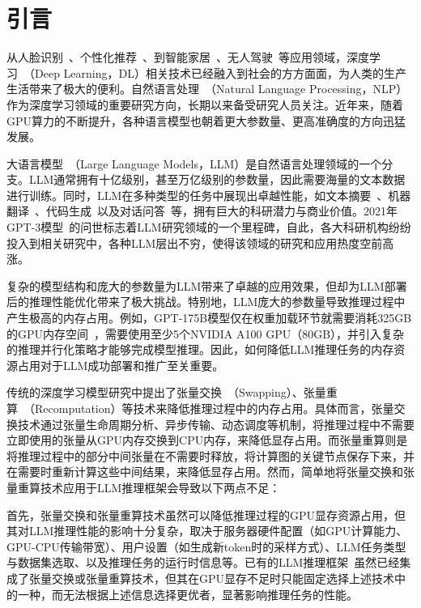 \section{引言}

从人脸识别~\cite{Face-Recognition}、个性化推荐~\cite{Personal-Recommendation}、到智能家居~\cite{Smart-Home}、无人驾驶~\cite{Self-Driving-Car}等应用领域，深度学习~\cite{Deep-Learning}（Deep Learning，DL）相关技术已经融入到社会的方方面面，为人类的生产生活带来了极大的便利。自然语言处理~\cite{NLP}（Natural Language Processing，NLP）作为深度学习领域的重要研究方向，长期以来备受研究人员关注。近年来，随着GPU算力的不断提升，各种语言模型也朝着更大参数量、更高准确度的方向迅猛发展。

大语言模型~\cite{LLM}（Large Language Models，LLM）是自然语言处理领域的一个分支。LLM通常拥有十亿级别，甚至万亿级别的参数量，因此需要海量的文本数据进行训练。同时，LLM在多种类型的任务中展现出卓越性能，如文本摘要~\cite{Text-Summarization}、机器翻译~\cite{Machine-Translation}、代码生成~\cite{Code-Generation}以及对话问答~\cite{Question-Answer}等，拥有巨大的科研潜力与商业价值。2021年GPT-3模型~\cite{Text-Summarization, GPT3}的问世标志着LLM研究领域的一个里程碑，自此，各大科研机构纷纷投入到相关研究中，各种LLM层出不穷，使得该领域的研究和应用热度空前高涨。

复杂的模型结构和庞大的参数量为LLM带来了卓越的应用效果，但却为LLM部署后的推理性能优化带来了极大挑战。特别地，LLM庞大的参数量导致推理过程中产生极高的内存占用。例如，GPT-175B模型仅在权重加载环节就需要消耗325GB的GPU内存空间~\cite{GPT-175B资源消耗}，需要使用至少5个NVIDIA A100 GPU（80GB），并引入复杂的推理并行化策略才能够完成模型推理。因此，如何降低LLM推理任务的内存资源占用对于LLM成功部署和推广至关重要。

传统的深度学习模型研究中提出了张量交换~\cite{Swapping}（Swapping）、张量重算~\cite{Recomputation}（Recomputation）等技术来降低推理过程中的内存占用。具体而言，张量交换技术通过张量生命周期分析、异步传输、动态调度等机制，将推理过程中不需要立即使用的张量从GPU内存交换到CPU内存，来降低显存占用。而张量重算则是将推理过程中的部分中间张量在不需要时释放，将计算图的关键节点保存下来，并在需要时重新计算这些中间结果，来降低显存占用。然而，简单地将张量交换和张量重算技术应用于LLM推理框架会导致以下两点不足：

首先，张量交换和张量重算技术虽然可以降低推理过程的GPU显存资源占用，但其对LLM推理性能的影响十分复杂，取决于服务器硬件配置（如GPU计算能力、GPU-CPU传输带宽）、用户设置（如生成新token时的采样方式）、LLM任务类型与数据集选取、以及推理任务的运行时信息等。已有的LLM推理框架~\cite{Swapping, vLLM, ORCA}虽然已经集成了张量交换或张量重算技术，但其在GPU显存不足时只能固定选择上述技术中的一种，而无法根据上述信息选择更优者，显著影响推理任务的性能。

